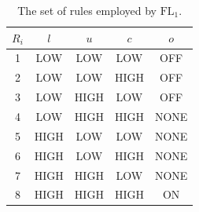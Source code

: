 \begin{table}[!t]
	\caption{The set of rules employed by $\mathrm{FL}_{1}$.}
	\label{tab:rules-FL1}
	\centering
	\begin{tabular}{c | c c c | c }
		$R_{i}$ & $l$ & $u$ & $c$ & $o$ \\
		\hline
		1 & LOW  & LOW  & LOW  & OFF \\
		2 & LOW  & LOW  & HIGH & OFF \\
		3 & LOW  & HIGH & LOW  & OFF \\
		\hline
		4 & LOW  & HIGH & HIGH  & NONE \\ 
		5 & HIGH & LOW  & LOW   & NONE \\ 
		6 & HIGH & LOW  & HIGH  & NONE \\ 
		7 & HIGH & HIGH & LOW   & NONE \\ 
		\hline
		8 & HIGH & HIGH & HIGH  & ON \\ 
	\end{tabular}
\end{table}

